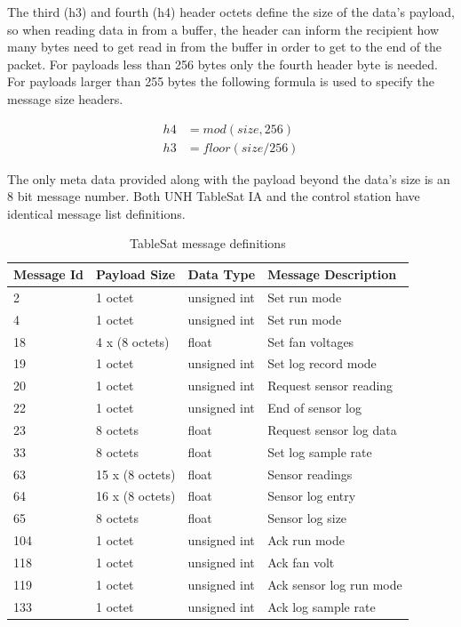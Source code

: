 The third (h3) and fourth (h4) header octets define the size of the data's payload, so when reading data in from a buffer, the header can inform the recipient how many bytes need to get read in from the buffer in order to get to the end of the packet.  For payloads less than 256 bytes only the fourth header byte is needed.  For payloads larger than 255 bytes the following formula is used to specify the message size headers.

\begin{subequations}
  \begin{align}
    h4 &= mod(size, 256) \\
    h3 &= floor(size / 256)
  \end{align}
  \label{eqn:UDPSizeHeader}
\end{subequations}

The only meta data provided along with the payload beyond the data's size is an 8 bit message number.  Both UNH TableSat IA and the control station have identical message list definitions.

\begin{table}[H]
  \centering
  \begin{tabular}{|l|l|l|l|}
    \hline
    Message Id & Payload Size & Data Type & Message Description \\ \hline
    2 & 1 octet & unsigned int & Set run mode \\ \hline
    4 & 1 octet & unsigned int & Set run mode \\ \hline
    18 & 4 x (8 octets) & float & Set fan voltages \\ \hline
    19 & 1 octet & unsigned int & Set log record mode \\ \hline
    20 & 1 octet & unsigned int & Request sensor reading \\ \hline
    22 & 1 octet & unsigned int & End of sensor log \\ \hline
    23 & 8 octets & float & Request sensor log data \\ \hline
    33 & 8 octets & float & Set log sample rate \\ \hline
    63 & 15 x (8 octets) & float & Sensor readings \\ \hline
    64 & 16 x (8 octets) & float & Sensor log entry \\ \hline
    65 & 8 octets & float & Sensor log size \\ \hline
    104 & 1 octet & unsigned int & Ack run mode \\ \hline
    118 & 1 octet & unsigned int & Ack fan volt \\ \hline
    119 & 1 octet & unsigned int & Ack sensor log run mode \\ \hline
    133 & 1 octet & unsigned int & Ack log sample rate \\ \hline
  \end{tabular}
  \caption{TableSat message definitions}
  \label{tbl:UDPMessageDefinitions}
\end{table}



